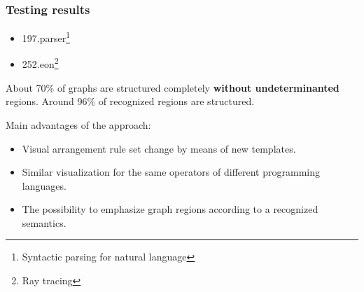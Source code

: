 \documentclass[aspectratio=169]{beamer}
\begin{document}

\begin{frame}
\frametitle{Testing results}
\begin{itemize}
	\item 197.parser\footnote{Syntactic parsing for natural language}
	\item 252.eon\footnote{Ray tracing}
\end{itemize}

About 70\% of graphs are structured completely \textbf{without undeterminanted} regions.  Around 96\% of recognized regions are structured.

Main advantages of the approach:
\begin{itemize}
	\item Visual arrangement rule set change by means of new templates.
	\item Similar visualization for the same operators of different programming languages.
	\item The possibility to emphasize graph regions according to a recognized semantics.
\end{itemize}

\end{frame}
\maketitle
\end{document}

